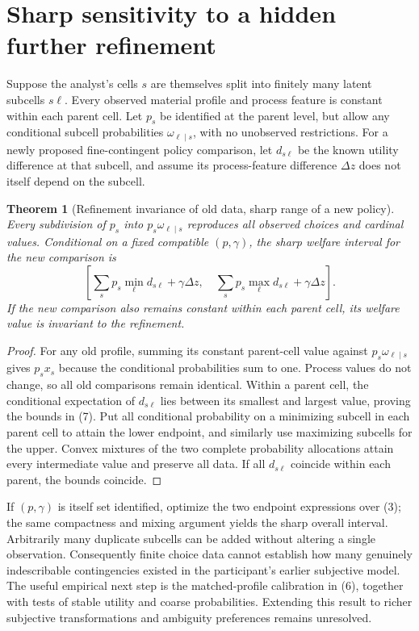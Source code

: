 \documentclass[11pt]{article}
\newtheorem{theorem}{Theorem}
\theoremstyle{remark}
\begin{document}
\section{Sharp sensitivity to a hidden further refinement}
Suppose the analyst's cells $s$ are themselves split into finitely many latent subcells $s\ell$. Every observed material profile and process feature is constant within each parent cell. Let $p_s$ be identified at the parent level, but allow any conditional subcell probabilities $\omega_{\ell\mid s}$, with no unobserved restrictions. For a newly proposed fine-contingent policy comparison, let $d_{s\ell}$ be the known utility difference at that subcell, and assume its process-feature difference $\Delta z$ does not itself depend on the subcell.

\begin{theorem}[Refinement invariance of old data, sharp range of a new policy]
Every subdivision of $p_s$ into $p_s\omega_{\ell\mid s}$ reproduces all observed choices and cardinal values. Conditional on a fixed compatible $(p,\gamma)$, the sharp welfare interval for the new comparison is
\[
 \left[\sum_sp_s\min_\ell d_{s\ell}+\gamma\Delta z,\quad
       \sum_sp_s\max_\ell d_{s\ell}+\gamma\Delta z\right].       \tag{7}
\]
If the new comparison also remains constant within each parent cell, its welfare value is invariant to the refinement.
\end{theorem}
\begin{proof}
For any old profile, summing its constant parent-cell value against $p_s\omega_{\ell\mid s}$ gives $p_sx_s$ because the conditional probabilities sum to one. Process values do not change, so all old comparisons remain identical. Within a parent cell, the conditional expectation of $d_{s\ell}$ lies between its smallest and largest value, proving the bounds in (7). Put all conditional probability on a minimizing subcell in each parent cell to attain the lower endpoint, and similarly use maximizing subcells for the upper. Convex mixtures of the two complete probability allocations attain every intermediate value and preserve all data. If all $d_{s\ell}$ coincide within each parent, the bounds coincide.
\end{proof}

If $(p,\gamma)$ is itself set identified, optimize the two endpoint expressions over (3); the same compactness and mixing argument yields the sharp overall interval. Arbitrarily many duplicate subcells can be added without altering a single observation. Consequently finite choice data cannot establish how many genuinely indescribable contingencies existed in the participant's earlier subjective model. The useful empirical next step is the matched-profile calibration in (6), together with tests of stable utility and coarse probabilities. Extending this result to richer subjective transformations and ambiguity preferences remains unresolved.
\end{document}
